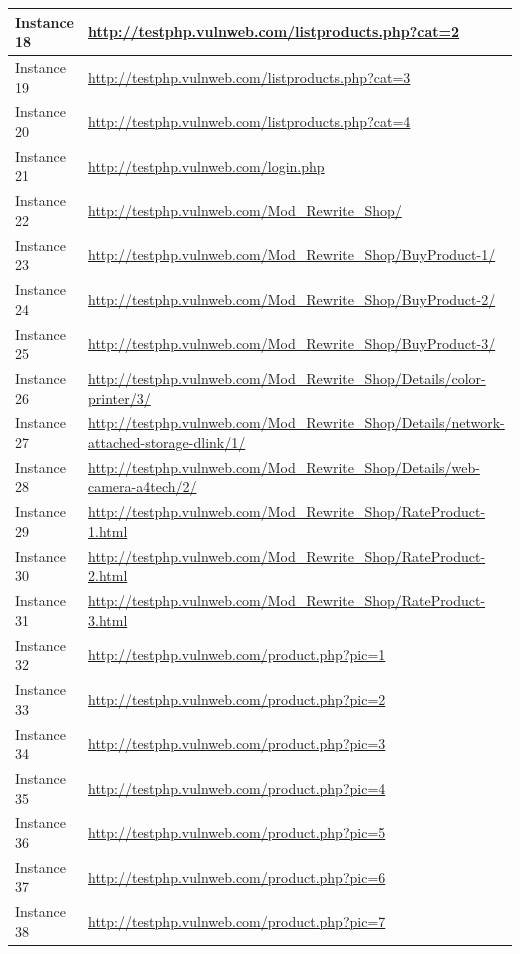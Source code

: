 \documentclass[12pt]{article}
\begin{document}
\begin{center}
\begin{longtable}{|l|p{10cm}|}
\hline
Instance 18 & \url{http://testphp.vulnweb.com/listproducts.php?cat=2} \\
\hline
Instance 19 & \url{http://testphp.vulnweb.com/listproducts.php?cat=3} \\
\hline
Instance 20 & \url{http://testphp.vulnweb.com/listproducts.php?cat=4} \\
\hline
Instance 21 & \url{http://testphp.vulnweb.com/login.php} \\
\hline
Instance 22 & \url{http://testphp.vulnweb.com/Mod\_Rewrite\_Shop/} \\
\hline
Instance 23 & \url{http://testphp.vulnweb.com/Mod\_Rewrite\_Shop/BuyProduct-1/} \\
\hline
Instance 24 & \url{http://testphp.vulnweb.com/Mod\_Rewrite\_Shop/BuyProduct-2/} \\
\hline
Instance 25 & \url{http://testphp.vulnweb.com/Mod\_Rewrite\_Shop/BuyProduct-3/} \\
\hline
Instance 26 & \url{http://testphp.vulnweb.com/Mod\_Rewrite\_Shop/Details/color-printer/3/} \\
\hline
Instance 27 & \url{http://testphp.vulnweb.com/Mod\_Rewrite\_Shop/Details/network-attached-storage-dlink/1/} \\
\hline
Instance 28 & \url{http://testphp.vulnweb.com/Mod\_Rewrite\_Shop/Details/web-camera-a4tech/2/} \\
\hline
Instance 29 & \url{http://testphp.vulnweb.com/Mod\_Rewrite\_Shop/RateProduct-1.html} \\
\hline
Instance 30 & \url{http://testphp.vulnweb.com/Mod\_Rewrite\_Shop/RateProduct-2.html} \\
\hline
Instance 31 & \url{http://testphp.vulnweb.com/Mod\_Rewrite\_Shop/RateProduct-3.html} \\
\hline
Instance 32 & \url{http://testphp.vulnweb.com/product.php?pic=1} \\
\hline
Instance 33 & \url{http://testphp.vulnweb.com/product.php?pic=2} \\
\hline
Instance 34 & \url{http://testphp.vulnweb.com/product.php?pic=3} \\
\hline
Instance 35 & \url{http://testphp.vulnweb.com/product.php?pic=4} \\
\hline
Instance 36 & \url{http://testphp.vulnweb.com/product.php?pic=5} \\
\hline
Instance 37 & \url{http://testphp.vulnweb.com/product.php?pic=6} \\
\hline
Instance 38 & \url{http://testphp.vulnweb.com/product.php?pic=7} \\

\end{longtable}
\end{center}
\end{document}
